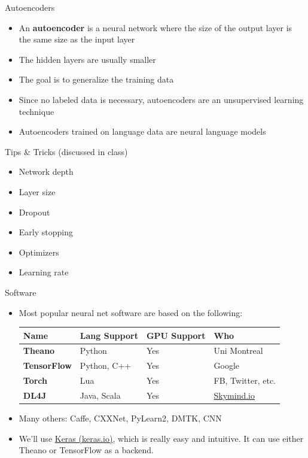 \documentclass[xcolor=pdftex,x11names,table,hyperref]{beamer}
\begin{document}
\begin{frame}{Autoencoders}
\begin{itemize}
	\item An \textbf{autoencoder} is a neural network where the size of the output layer is the same size as the input layer
	\item The hidden layers are usually smaller
	\item The goal is to generalize the training data
	\item Since no labeled data is necessary, autoencoders are an unsupervised learning technique
	\item Autoencoders trained on language data are neural language models
\end{itemize}
\end{frame}

\begin{frame}{Tips \& Tricks (discussed in class)}
\begin{itemize}
	\item Network depth
	\item Layer size
	\item Dropout
	\item Early stopping
	\item Optimizers
	\item Learning rate
\end{itemize}
\end{frame}

\begin{frame}{Software}
\begin{itemize}
	\item Most popular neural net software are based on the following: \\[1.0em]
\hspace*{-2.0em}%
\begin{tabular}{llll}
	\bf Name & \bf Lang Support & \bf GPU Support & \bf Who \\
	\hline
	\bf Theano & Python & Yes & Uni Montreal \\
	\bf TensorFlow & Python, C++ & Yes & Google \\
	\bf Torch & Lua & Yes & FB, Twitter, etc. \\
	\bf DL4J & Java, Scala & Yes & \href{http://skymind.io}{Skymind.io} \\
\end{tabular}
\vspace*{1.0em}
\pause
\item Many others: Caffe, CXXNet, PyLearn2, DMTK, CNN
\pause
\item We'll use \href{http://keras.io}{Keras (keras.io)}, which is really easy and intuitive.  It can use either Theano or TensorFlow as a backend.
\end{itemize}
\end{frame}
\end{document}
